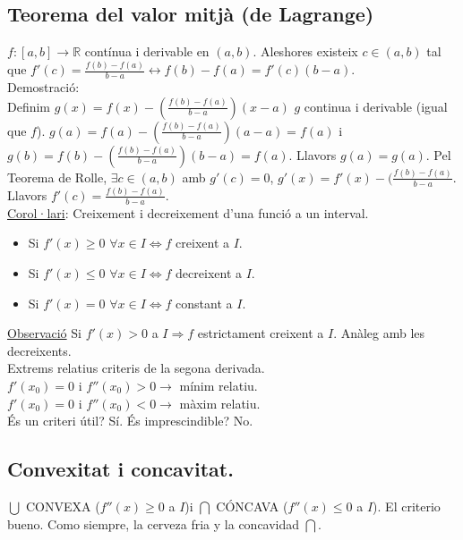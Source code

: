 \documentclass[../main.tex]{subfiles}
\begin{document}
    \subsection{Teorema del valor mitjà (de Lagrange)}
    $f: [a, b] \rightarrow \mathbb{R}$ contínua i derivable en $(a, b)$. Aleshores existeix $c \in (a, b)$ tal que $f'(c) = \frac{f(b) - f(a)}{b-a} \leftrightarrow f(b) - f(a) = f'(c)(b-a)$.\\
    Demostració:\\
    Definim $g(x) = f(x) - (\frac{f(b)-f(a)}{b-a})(x-a)$ $g$ continua i derivable (igual que $f$). $g(a) = f(a) - (\frac{f(b)-f(a)}{b-a})(a-a) = f(a)$ i $g(b) = f(b) - (\frac{f(b)-f(a)}{b-a})(b-a) = f(a)$. Llavors $g(a) = g(a)$. Pel Teorema de Rolle, $\exists c \in (a,b)$ amb $g'(c) = 0$, $g'(x) = f'(x) - (\frac{f(b)-f(a)}{b-a}$. Llavors $f'(c) = \frac{f(b)-f(a)}{b-a}$.\\
    \underline{Corol·lari}: Creixement i decreixement d'una funció a un interval.
    \begin{itemize}
        \item Si $f'(x) \geq 0$ $\forall x \in I \Longleftrightarrow f$ creixent a $I$.
        \item Si $f'(x) \leq 0$ $\forall x \in I \Longleftrightarrow f$ decreixent a $I$.
        \item Si $f'(x) = 0$ $\forall x \in I \Longleftrightarrow f$ constant a $I$.
    \end{itemize}
    \underline{Observació} Si $f'(x) > 0$ a $I \Rightarrow f$ estrictament creixent a $I$. Anàleg amb les decreixents.\\
    Extrems relatius criteris de la segona derivada.\\
    $f'(x_0) = 0$ i $f''(x_0) > 0 \rightarrow$ mínim relatiu.\\
    $f'(x_0) = 0$ i $f''(x_0) < 0 \rightarrow$ màxim relatiu.\\
    És un criteri útil? Sí. És imprescindible? No.\\
    \subsection{Convexitat i concavitat.}
    $\bigcup$ CONVEXA ($f''(x) \geq 0$ a $I$)i $\bigcap$ CÓNCAVA ($f''(x) \leq 0$ a $I$). El criterio bueno. Como siempre, la cerveza fria y la concavidad $\bigcap$.
\end{document}
